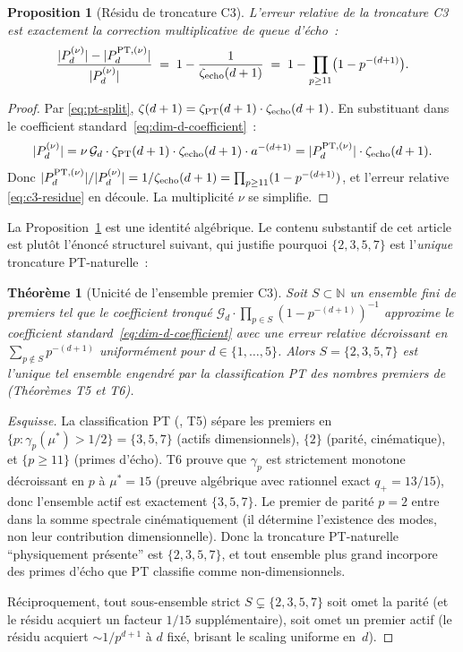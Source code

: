 \documentclass[11pt,a4paper]{article}
\newtheorem{theoreme}{Théorème}
\newtheorem{proposition}{Proposition}
\newcommand{\actives}{\{3,5,7\}}
\newcommand{\PTset}{\{2,3,5,7\}}
\begin{document}
\begin{proposition}[Résidu de troncature C3]
\label{prop:c3-residue}
L'erreur relative de la troncature C3 est exactement la correction multiplicative de queue
d'écho~:
\begin{equation}
\frac{|P_{d}^{(\nu)}| - |P_{d}^{{\rm PT},(\nu)}|}{|P_{d}^{(\nu)}|}
\;=\; 1 - \frac{1}{\zeta_{\rm echo}(d+1)}
\;=\; 1 - \prod_{p \geq 11}\bigl(1 - p^{-(d+1)}\bigr).
\label{eq:c3-residue}
\end{equation}
\end{proposition}

\begin{proof}
Par \eqref{eq:pt-split}, $\zeta(d+1) = \zeta_{\rm PT}(d+1) \cdot \zeta_{\rm echo}(d+1)$. En
substituant dans le coefficient standard~\eqref{eq:dim-d-coefficient}~:
\[
|P_{d}^{(\nu)}| = \nu\,\mathcal{G}_{d} \cdot \zeta_{\rm PT}(d+1) \cdot \zeta_{\rm echo}(d+1) \cdot a^{-(d+1)} = |P_{d}^{{\rm PT},(\nu)}| \cdot \zeta_{\rm echo}(d+1).
\]
Donc $|P_{d}^{{\rm PT},(\nu)}|/|P_{d}^{(\nu)}| = 1/\zeta_{\rm echo}(d+1) = \prod_{p \geq 11}(1-p^{-(d+1)})$, et
l'erreur relative \eqref{eq:c3-residue} en découle. La multiplicité $\nu$ se simplifie.
\end{proof}

La Proposition~\ref{prop:c3-residue} est une identité algébrique. Le contenu substantif de cet
article est plutôt l'énoncé structurel suivant, qui justifie pourquoi $\PTset$ est l'\emph{unique}
troncature PT-naturelle~:

\begin{theoreme}[Unicité de l'ensemble premier C3]
\label{thm:c3-uniqueness}
Soit $S \subset \mathbb{N}$ un ensemble fini de premiers tel que le coefficient tronqué
$\mathcal{G}_{d} \cdot \prod_{p \in S}(1-p^{-(d+1)})^{-1}$ approxime le coefficient
standard~\eqref{eq:dim-d-coefficient} avec une erreur relative décroissant en
$\sum_{p \notin S} p^{-(d+1)}$ uniformément pour $d \in \{1,\ldots,5\}$. Alors $S = \PTset$ est
l'unique tel ensemble engendré par la classification PT des nombres premiers
de~\cite{Senez2026} (Théorèmes T5 et T6).
\end{theoreme}

\begin{proof}[Esquisse]
La classification PT (\cite{Senez2026}, T5) sépare les premiers en $\{p : \gamma_p(\mu^*) > 1/2\}
= \actives$ (actifs dimensionnels), $\{2\}$ (parité, cinématique), et $\{p \geq 11\}$ (primes d'écho).
T6 prouve que $\gamma_p$ est strictement monotone décroissant en $p$ à $\mu^* = 15$ (preuve
algébrique avec rationnel exact $q_+ = 13/15$), donc l'ensemble actif est exactement
$\{3, 5, 7\}$. Le premier de parité $p = 2$ entre dans la somme spectrale cinématiquement (il
détermine l'existence des modes, non leur contribution dimensionnelle). Donc la troncature
PT-naturelle ``physiquement présente'' est $\PTset$, et tout ensemble plus grand incorpore des
primes d'écho que PT classifie comme non-dimensionnels.

Réciproquement, tout sous-ensemble strict $S \subsetneq \PTset$ soit omet la parité (et le
résidu acquiert un facteur $1/15$ supplémentaire), soit omet un premier actif (le résidu
acquiert $\sim 1/p^{d+1}$ à $d$ fixé, brisant le scaling uniforme en~$d$).
\end{proof}
\end{document}
